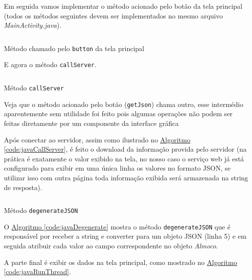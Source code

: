 \documentclass[a4paper,12pt,brazil,oneside]{book}
\begin{document}
Em seguida vamos implementar o método acionado pelo botão da tela principal (todos os métodos seguintes devem ser implementados no mesmo arquivo \emph{MainActivity.java}).

\begin{listing}[H]
	\inputminted[linenos=true,fontsize=\small,frame=lines, framesep=2mm, tabsize=2,numbersep=5pt]{xml}{src/devapp/cardapio/getJson.java}
	\caption{Método chamado pelo \texttt{button} da tela principal}
	\label{code:javaGetJson}
	\end{listing}

E agora o método \texttt{callServer}.

\begin{listing}[H]
	\inputminted[linenos=true,fontsize=\small,frame=lines, framesep=2mm, tabsize=2,numbersep=5pt]{xml}{src/devapp/cardapio/callServer.java}
	\caption{Método \texttt{callServer}}
	\label{code:javaCallServer}
	\end{listing}
	
Veja que o método acionado pelo botão (\texttt{getJson}) chama outro, esse intermédio aparentemente sem utilidade foi feito pois algumas operações não podem ser feitas diretamente por um componente da interface gráfica 

Após conectar ao servidor, assim como ilustrado no \hyperref[code:javaCallServer]{Algoritmo \ref*{code:javaCallServer}}, é feito o download da informação provida pelo servidor (na prática é exatamente o valor exibido na tela, no nosso caso o serviço web já está configurado para exibir em uma única linha os valores no formato JSON, se utilizar isso com outra página toda informação exibida será armazenada na string de resposta).

\begin{listing}[H]
	\inputminted[linenos=true,fontsize=\small,frame=lines, framesep=2mm, tabsize=2,numbersep=5pt]{xml}{src/devapp/cardapio/degenerateJSON.java}
	\caption{Método \texttt{degenerateJSON}}
	\label{code:javaDegenerate}
	\end{listing}

O \hyperref[code:javaDegenerate]{Algoritmo \ref*{code:javaDegenerate}} mostra o método \texttt{degenerateJSON} que é responsável por receber a string e converter para um objeto JSON (linha 5) e em seguida atribuir cada valor ao campo correspondente no objeto \emph{Almoco}.

A parte final é exibir os dados na tela principal, como mostrado no \hyperref[code:javaRunThread]{Algoritmo \ref*{code:javaRunThread}}.
\end{document}
